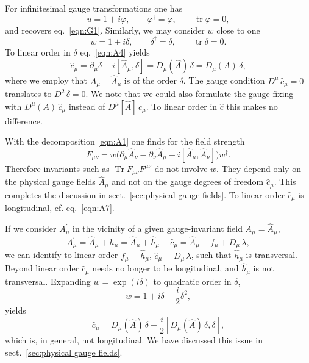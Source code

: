 \documentclass[twocolumn,aps,prd,amsmath,amssymb,preprintnumbers,longbibliography]{revtex4-1}
\numberwithin{equation}{section}
\newcounter{condition}[equation]
\DeclareMathOperator{\tr}{tr}
\DeclareMathOperator{\Tr}{Tr}
\begin{document}
\begin{appendices}
For infinitesimal gauge transformations one has
\begin{equation}\label{eqn:A5}
	u
	= 1 + i \varphi,
	\qquad
	\varphi^\dagger
	= \varphi,
	\qquad
	\tr\varphi
	= 0,
\end{equation}
and recovers eq.~\eqref{eqn:G1}. Similarly, we may consider $w$ close to one
\begin{equation}\label{eqn:A6}
	w
	= 1 + i \delta,
	\qquad
	\delta^\dagger
	= \delta,
	\qquad
	\tr\delta
	= 0.
\end{equation}
To linear order in $\delta$ eq.~\eqref{eqn:A4} yields
\begin{equation}\label{eqn:A7}
	\hat{c}_\mu
	= \partial_\mu \delta - i [\hat{A}_\mu,\delta]
	= D_\mu(\hat{A}) \, \delta
	= D_\mu(A) \, \delta,
\end{equation}
where we employ that $A_\mu - \hat{A}_\mu$ is of the order $\delta$. The gauge condition $D^\mu \, \hat{c}_\mu = 0$ translates to $D^2 \, \delta = 0$. We note that we could also formulate the gauge fixing with $D^\mu(A) \, \hat{c}_\mu$ instead of $D^\mu[\hat{A}] \, \hat{c}_\mu$. To linear order in $\hat{c}$ this makes no difference.

With the decomposition \eqref{eqn:A1} one finds for the field strength
\begin{equation}\label{eqn:A8}
	F_{\mu\nu}
	= w \bigl(\partial_\mu \hat{A}_\nu - \partial_\nu \hat{A}_\mu - i [\hat{A}_\mu,\hat{A}_\nu]\bigr) w^\dagger.
\end{equation}
Therefore invariants such as $\Tr F_{\mu\nu} F^{\mu\nu}$ do not involve $w$. They depend only on the physical gauge fields $\hat{A}_\mu$ and not on the gauge degrees of freedom $\hat{c}_\mu$. This completes the discussion in sect.~\ref{sec:physical gauge fields}. To linear order $\hat{c}_\mu$ is longitudinal, cf. eq.~\eqref{eqn:A7}.

If we consider $A_\mu^\prime$ in the vicinity of a given gauge-invariant field $A_\mu = \hat{A}_\mu$,
\begin{equation}\label{eqn:A9}
	A_\mu^\prime
	= \hat{A}_\mu + h_\mu
	= \hat{A}_\mu + \hat{h}_\mu + \hat{c}_\mu
	= \hat{A}_\mu + f_\mu + D_\mu \, \lambda,
\end{equation}
we can identify to linear order $f_\mu = \hat{h}_\mu$, $\hat{c}_\mu = D_\mu \, \lambda$, such that $\hat{h}_\mu$ is transversal. Beyond linear order $\hat{c}_\mu$ needs no longer to be longitudinal, and $\hat{h}_\mu$ is not transversal. Expanding $w = \exp(i \delta)$ to quadratic order in $\delta$,
\begin{equation}\label{eqn:A10}
	w
	= 1 + i \delta - \frac{i}{2} \delta^2,
\end{equation}
yields
\begin{equation}\label{eqn:A11}
	\hat{c}_\mu
	= D_\mu(\hat{A}) \, \delta - \frac{i}{2} [D_\mu(\hat{A}) \, \delta,\delta],
\end{equation}
which is, in general, not longitudinal. We have discussed this issue in sect.~\ref{sec:physical gauge fields}.


\end{appendices}
\end{document}
